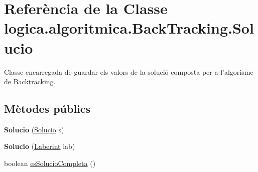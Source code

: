 \hypertarget{classlogica_1_1algoritmica_1_1_back_tracking_1_1_solucio}{\section{Referència de la Classe logica.\+algoritmica.\+Back\+Tracking.\+Solucio}
\label{classlogica_1_1algoritmica_1_1_back_tracking_1_1_solucio}
}


Classe encarregada de guardar els valors de la solució composta per a l'algorisme de Backtracking.  


\subsection*{Mètodes públics}
\begin{DoxyCompactItemize}
\item 
\hypertarget{classlogica_1_1algoritmica_1_1_back_tracking_1_1_solucio_a78c238865047b1231e0b4e8ad03a915e}{{\bfseries Solucio} (\hyperlink{classlogica_1_1algoritmica_1_1_back_tracking_1_1_solucio}{Solucio} s)}\label{classlogica_1_1algoritmica_1_1_back_tracking_1_1_solucio_a78c238865047b1231e0b4e8ad03a915e}

\item 
\hypertarget{classlogica_1_1algoritmica_1_1_back_tracking_1_1_solucio_ad5234eb9a522b98d9b85617e5f6a6aa9}{{\bfseries Solucio} (\hyperlink{classlogica_1_1laberints_1_1_laberint}{Laberint} lab)}\label{classlogica_1_1algoritmica_1_1_back_tracking_1_1_solucio_ad5234eb9a522b98d9b85617e5f6a6aa9}

\item 
\hypertarget{classlogica_1_1algoritmica_1_1_back_tracking_1_1_solucio_a57f299c219b3b09e317feac9e3e2eced}{boolean \hyperlink{classlogica_1_1algoritmica_1_1_back_tracking_1_1_solucio_a57f299c219b3b09e317feac9e3e2eced}{es\+Solucio\+Completa} ()}\label{classlogica_1_1algoritmica_1_1_back_tracking_1_1_solucio_a57f299c219b3b09e317feac9e3e2eced}


\end{DoxyCompactItemize}
